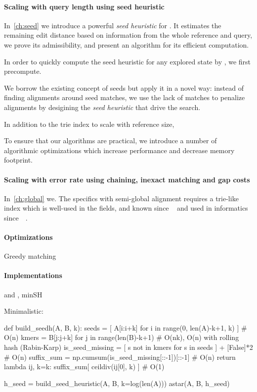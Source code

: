 \paragraph{Scaling with query length using seed heuristic}
In~\cref{ch:seed} we introduce a powerful \emph{seed heuristic} for \A. It
estimates the remaining edit distance based on information from the whole
reference and query, we prove its admissibility, and present an algorithm for
its efficient computation.

In order to quickly compute the seed heuristic for any explored state by \A, we
first precompute.

We borrow the existing concept of seeds but apply it in a novel way: instead of
finding alignments around seed matches, we use the lack of matches to penalize
alignments by desigining the \emph{seed heuristic} that drive the \A search.

In addition to the trie index to scale with reference size, 

To ensure that our algorithms are practical, we introduce a number of
algorithmic optimizations which increase performance and decrease memory
footprint.
%

\paragraph{Scaling with error rate using chaining, inexact matching and gap costs}
In~\cref{ch:global} we. The specifics with semi-global alignment requires a
trie-like index which is well-used in the fields, and known since
\citeyear{thue1912gegenseitige}~\cite{thue1912gegenseitige} and used in
informatics since~\citeyear{de1959file}~\cite{de1959file}.

\paragraph{Optimizations} Greedy matching

\paragraph{Implementations}
\astarix and \astarpa, minSH

Minimalistic: 

def build_seedh(A, B, k):
    seeds = [ A[i:i+k] for i in range(0, len(A)-k+1, k) ]           # O(n)   
    kmers = { B[j:j+k] for j in range(len(B)-k+1) }                 # O(nk), O(n) with rolling hash (Rabin-Karp)
    is_seed_missing = [ s not in kmers for s in seeds ] + [False]*2 # O(n)
    suffix_sum = np.cumsum(is_seed_missing[::-1])[::-1]             # O(n)
    return lambda ij, k=k: suffix_sum[ ceildiv(ij[0], k) ]          # O(1)

h_seed = build_seed_heuristic(A, B, k=log(len(A)))
astar(A, B, h_seed)